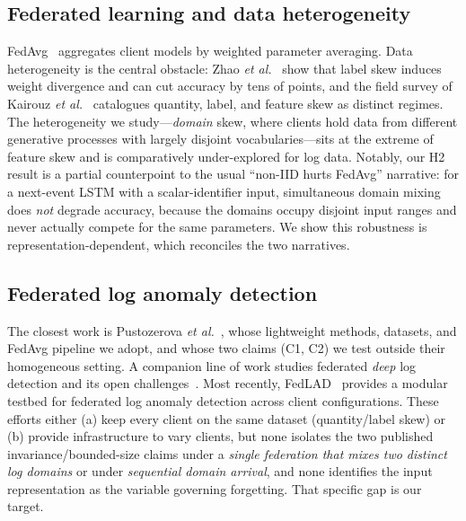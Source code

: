 \documentclass[journal]{IEEEtran}
\begin{document}
\subsection{Federated learning and data heterogeneity}
FedAvg~\cite{mcmahan2017communication} aggregates client models by weighted parameter averaging.
Data heterogeneity is the central obstacle: Zhao \emph{et al.}~\cite{zhao2018federated} show that
label skew induces weight divergence and can cut accuracy by tens of points, and the field survey
of Kairouz \emph{et al.}~\cite{kairouz2021advances} catalogues quantity, label, and feature skew as
distinct regimes. The heterogeneity we study---\emph{domain} skew, where clients hold data from
different generative processes with largely disjoint vocabularies---sits at the extreme of feature
skew and is comparatively under-explored for log data. Notably, our H2 result is a partial
counterpoint to the usual ``non-IID hurts FedAvg'' narrative: for a next-event LSTM with a
scalar-identifier input, simultaneous domain mixing does \emph{not} degrade accuracy, because the
domains occupy disjoint input ranges and never actually compete for the same parameters. We show
this robustness is representation-dependent, which reconciles the two narratives.

\subsection{Federated log anomaly detection}
The closest work is Pustozerova \emph{et al.}~\cite{pustozerova2026lightweight}, whose lightweight
methods, datasets, and FedAvg pipeline we adopt, and whose two claims (C1, C2) we test outside
their homogeneous setting. A companion line of work studies federated \emph{deep} log detection and
its open challenges~\cite{fedlog2024openchallenges}. Most recently, FedLAD~\cite{fedlad2025}
provides a modular testbed for federated log anomaly detection across client configurations. These
efforts either (a) keep every client on the same dataset (quantity/label skew) or (b) provide
infrastructure to vary clients, but none isolates the two published invariance/bounded-size claims
under a \emph{single federation that mixes two distinct log domains} or under \emph{sequential
domain arrival}, and none identifies the input representation as the variable governing forgetting.
That specific gap is our target.
\end{document}
